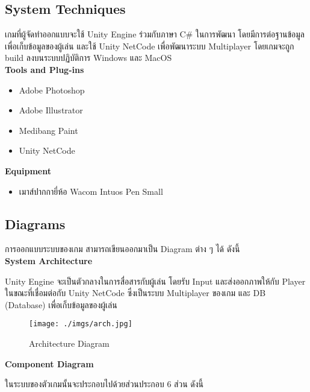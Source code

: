 \documentclass[12pt,oneside,openright,a4paper]{cpe-thai-project}
\begin{document}
\subsection{System Techniques}
เกมที่ผู้จัดทำออกแบบจะใช้ Unity Engine ร่วมกับภาษา C\# 
ในการพัฒนา โดยมีการต่อฐานข้อมูลเพื่อเก็บข้อมูลของผู้เล่น 
และใช้ Unity NetCode เพื่อพัฒนาระบบ Multiplayer 
โดยเกมจะถูก build ลงบนระบบปฏิบัติการ Windows และ MacOS\\

\textbf{Tools and Plug-ins}
\begin{itemize}
  \item Adobe Photoshop
  \item Adobe Illustrator
  \item Medibang Paint
  \item Unity NetCode
\end{itemize} 

\textbf{Equipment}
\begin{itemize}
  \item เมาส์ปากกายี่ห้อ Wacom Intuos Pen Small
\end{itemize}

\subsection{Diagrams}
การออกแบบระบบของเกม สามารถเขียนออกมาเป็น Diagram ต่าง ๆ ได้ ดังนี้\\

\textbf{System Architecture}

Unity Engine จะเป็นตัวกลางในการสื่อสารกับผู้เล่น 
โดยรับ Input และส่งออกภาพให้กับ Player ในขณะที่เชื่อมต่อกับ 
Unity NetCode ซึ่งเป็นระบบ Multiplayer ของเกม และ DB (Database) 
เพื่อเก็บข้อมูลของผู้เล่น

\begin{figure}[H]\centering
  \texttt{[image: ./imgs/arch.jpg]}
  \caption{Architecture Diagram}\label{fig:arch}
\end{figure}

\textbf{Component Diagram}

ในระบบของตัวเกมนั้นจะประกอบไปด้วยส่วนประกอบ 6 ส่วน ดังนี้
\end{document}
